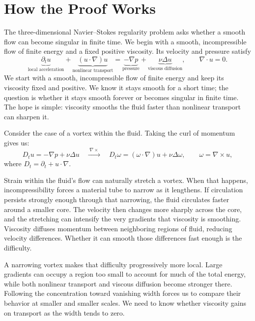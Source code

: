 \begingroup
\setlength{\parindent}{0pt}
\setlength{\parskip}{0.40\baselineskip}
\setlength{\abovedisplayskip}{6.5pt plus 1.5pt minus 1.5pt}
\setlength{\belowdisplayskip}{6.5pt plus 1.5pt minus 1.5pt}
\setlength{\jot}{5pt}

\section*{How the Proof Works}

The three-dimensional Navier--Stokes regularity problem asks whether a smooth
flow can become singular in finite time. We begin with a smooth,
incompressible flow of finite energy and a fixed positive viscosity. Its
velocity and pressure satisfy
\[
 \underbrace{\partial_tu}_{\text{local acceleration}}
 +\underbrace{(u\!\cdot\nabla)u}_{\text{nonlinear transport}}
 =\underbrace{-\nabla p}_{\text{pressure}}
 +\underbrace{\nu\Delta u}_{\text{viscous diffusion}},
 \qquad \nabla\!\cdot u=0.
\]
We start with a smooth, incompressible flow of finite energy and keep its
viscosity fixed and positive. We know it stays smooth for a short time; the
question is whether it stays smooth forever or becomes singular in finite
time. The hope is simple: viscosity smooths the fluid faster than nonlinear
transport can sharpen it.

Consider the case of a vortex within the fluid. Taking the curl of momentum
gives us:
\[
 D_tu=-\nabla p+\nu\Delta u
 \quad\xrightarrow{\;\nabla\times\;}\quad
 D_t\omega=(\omega\cdot\nabla)u+\nu\Delta\omega,
 \qquad \omega=\nabla\times u,
\]
where \(D_t=\partial_t+u\cdot\nabla\).

Strain within the fluid's flow can naturally stretch a vortex. When that
happens, incompressibility forces a material tube to narrow as it lengthens.
If circulation persists strongly enough through that narrowing, the fluid
circulates faster around a smaller core. The velocity then changes more
sharply across the core, and the stretching can intensify the very gradients
that viscosity is smoothing. Viscosity diffuses momentum between neighboring
regions of fluid, reducing velocity differences. Whether it can smooth
those differences fast enough is the
difficulty.

A narrowing vortex makes that difficulty progressively more local. Large
gradients can occupy a region too small to account for much of the total
energy, while both nonlinear transport and viscous diffusion become stronger
there. Following the concentration toward vanishing width forces us to
compare their behavior at smaller and smaller scales. We need to know whether viscosity gains on transport as the width tends
to zero.

